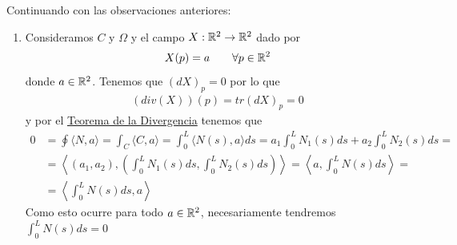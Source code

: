 \begin{observacion}
    Continuando con las observaciones anteriores:
    \begin{enumerate}[start=4]
        \item Consideramos $C$ y $\Omega$ y el campo $X:\mathbb{R}^2 \to \mathbb{R}^2$ dado por 
        \begin{gather*}
            X(p)=a \qquad \forall p \in \mathbb{R}^2
        \end{gather*}
        donde $a\in \mathbb{R}^2$. Tenemos que $(dX)_p=0$ por lo que 
        \begin{gather*}
            (div(X))(p) = tr(dX)_p = 0
        \end{gather*}
        y por el \hyperref[teo:divergencia]{Teorema de la Divergencia} tenemos que 
        \begin{align*}
            0 &= \oint \langle N, a \rangle = \int_C \langle C, a \rangle = \int_0^L \langle N(s), a \rangle ds
            = a_1 \int_0^L N_1(s) ds + a_2\int_0^L N_2(s)ds =\\
            &= \left\langle (a_1, a_2), \left(  \int_0^L N_1(s) ds,  \int_0^L N_2(s) ds \right) \right\rangle = \left\langle a,  \int_0^L N(s) ds \right\rangle =\\
            &= \left\langle \int_0^L N(s) ds, a \right\rangle
        \end{align*}
        Como esto ocurre para todo $a\in \mathbb{R}^2$, necesariamente tendremos $\int_0^L N(s) ds = 0$


\end{enumerate}
\end{observacion}
